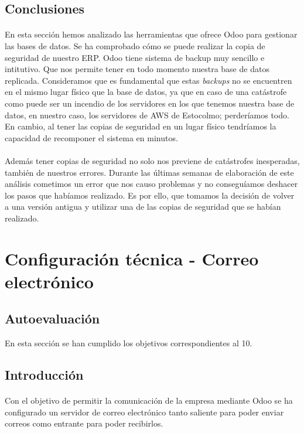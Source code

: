 \subsection{Conclusiones}
\paragraph{}
En esta sección hemos analizado las herramientas que ofrece Odoo para gestionar las bases de datos. Se ha comprobado cómo se puede realizar la copia de seguridad de nuestro ERP. Odoo tiene sistema de backup muy sencillo e intitutivo. Que nos permite tener en todo momento nuestra base de datos replicada. Consideramos que es fundamental que estas \textit{backups} no se encuentren en el mismo lugar físico que la base de datos, ya que en caso de una catástrofe como puede ser un incendio de los servidores en los que tenemos nuestra base de datos, en nuestro caso, los servidores de AWS de Estocolmo; perderíamos todo. En cambio, al tener las copias de seguridad en un lugar físico tendríamos la capacidad de recomponer el sistema en minutos.

\paragraph{}
Además tener copias de seguridad no solo nos previene de catástrofes inesperadas, también de nuestros errores. Durante las últimas semanas de elaboración de este análisis cometimos un error que nos causo problemas y no conseguíamos deshacer los pasos que habíamos realizado. Es por ello, que tomamos la decisión de volver a una versión antigua y utilizar una de las copias de seguridad que se habían realizado.
\newpage
\section{Configuración técnica - Correo electrónico}
\label{sec:correo}
\subsection{Autoevaluación}
En esta sección se han cumplido los objetivos correspondientes al 10.
\subsection{Introducción}
\paragraph{}
Con el objetivo de permitir la comunicación de la empresa mediante Odoo se ha configurado un servidor de correo electrónico tanto saliente para poder enviar correos como entrante para poder recibirlos.
